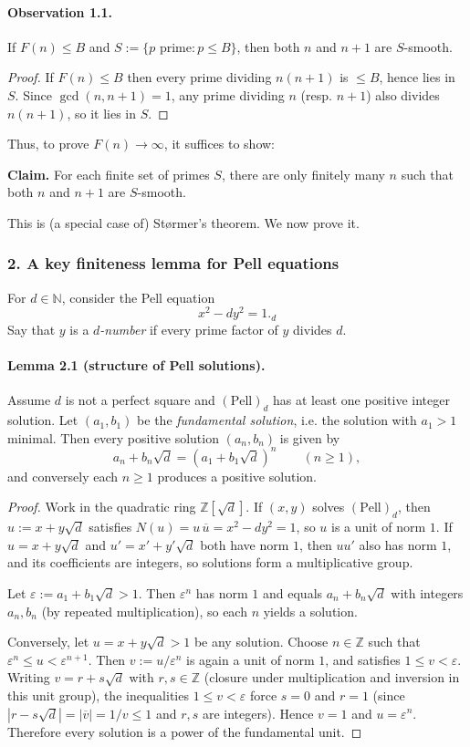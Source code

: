 \paragraph{Observation 1.1.} If $F(n)\le B$ and $S:=\{p\text{ prime}:p\le B\}$, then both $n$ and $n+1$ are $S$-smooth.
\begin{proof}
If $F(n)\le B$ then every prime dividing $n(n+1)$ is $\le B$, hence lies in $S$.
Since $\gcd(n,n+1)=1$, any prime dividing $n$ (resp. $n+1$) also divides $n(n+1)$, so it lies in $S$.
\end{proof}

Thus, to prove $F(n)\to\infty$, it suffices to show:

\medskip
\noindent\textbf{Claim.} For each finite set of primes $S$, there are only finitely many $n$ such that both $n$ and $n+1$ are $S$-smooth.

This is (a special case of) St\o rmer's theorem. We now prove it.

\subsubsection*{2. A key finiteness lemma for Pell equations}
For $d\in\mathbb{N}$, consider the Pell equation
\[
 x^2-dy^2=1.
\tag{Pell}_d
\]
Say that $y$ is a \emph{$d$-number} if every prime factor of $y$ divides $d$.

\paragraph{Lemma 2.1 (structure of Pell solutions).}
Assume $d$ is not a perfect square and $(\mathrm{Pell})_d$ has at least one positive integer solution.
Let $(a_1,b_1)$ be the \emph{fundamental solution}, i.e. the solution with $a_1>1$ minimal.
Then every positive solution $(a_n,b_n)$ is given by
\[
 a_n+b_n\sqrt d = (a_1+b_1\sqrt d)^n\qquad(n\ge 1),
\]
and conversely each $n\ge 1$ produces a positive solution.
\begin{proof}
Work in the quadratic ring $\mathbb{Z}[\sqrt d]$.
If $(x,y)$ solves $(\mathrm{Pell})_d$, then $u:=x+y\sqrt d$ satisfies $N(u)=u\,\overline u=x^2-dy^2=1$, so $u$ is a unit of norm $1$.
If $u=x+y\sqrt d$ and $u'=x'+y'\sqrt d$ both have norm $1$, then $uu'$ also has norm $1$, and its coefficients are integers, so solutions form a multiplicative group.

Let $\varepsilon:=a_1+b_1\sqrt d>1$.
Then $\varepsilon^n$ has norm $1$ and equals $a_n+b_n\sqrt d$ with integers $a_n,b_n$ (by repeated multiplication), so each $n$ yields a solution.

Conversely, let $u=x+y\sqrt d>1$ be any solution.
Choose $n\in\mathbb{Z}$ such that $\varepsilon^n\le u<\varepsilon^{n+1}$.
Then $v:=u/\varepsilon^n$ is again a unit of norm $1$, and satisfies $1\le v<\varepsilon$.
Writing $v=r+s\sqrt d$ with $r,s\in\mathbb{Z}$ (closure under multiplication and inversion in this unit group), the inequalities $1\le v<\varepsilon$ force $s=0$ and $r=1$ (since $|r-s\sqrt d|=|\overline v|=1/v\le 1$ and $r,s$ are integers).
Hence $v=1$ and $u=\varepsilon^n$.
Therefore every solution is a power of the fundamental unit.
\end{proof}

